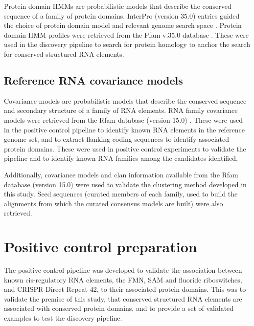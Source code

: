 Protein domain \ac{HMM}s are probabilistic models that describe the conserved sequence of a family of protein domains.
InterPro (version 35.0) entries guided the choice of protein domain model and relevant genome search space \citep{Blum2025}.
Protein domain \ac{HMM} profiles were retrieved from the Pfam v.35.0 database \citep{Paysan-Fafosse2025}.
These were used in the discovery pipeline to search for protein homology to anchor the search for conserved structured RNA elements.

\subsection{Reference RNA covariance models}
\label{subsec:covariance-models}

Covariance models are probabilistic models that describe the conserved sequence and secondary structure of a family of RNA elements.
RNA family covariance models were retrieved from the Rfam database (version 15.0) \citep{Ontiveros-Palacios2025}.
These were used in the positive control pipeline to identify known RNA elements in the reference genome set, and to extract flanking coding sequences to identify associated protein domains.
These were used in positive control experiments to validate the pipeline and to identify known RNA families among the candidates identified.

Additionally, covariance models and clan information available from the Rfam database (version 15.0) \citep{Ontiveros-Palacios2025} were used to validate the clustering method developed in this study.
Seed sequences (curated members of each family, used to build the alignments from which the curated consensus models are built) were also retrieved.


\section{Positive control preparation}
\label{sec:poscontrol-pipeline}

The positive control pipeline was developed to validate the association between known cis-regulatory RNA elements, the \ac{FMN}, \ac{SAM} and fluoride riboswitches, and \ac{CRISPR}-Direct Repeat 42, to their associated protein domains.
This was to validate the premise of this study, that conserved structured RNA elements are associated with conserved protein domains, and to provide a set of validated examples to test the discovery pipeline.

